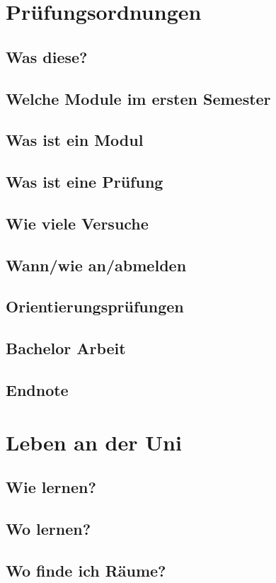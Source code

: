 \documentclass[
	aspectratio=169, 
	8pt 
]{beamer}
\begin{document}
\section{Prüfungsordnungen}
\subsection{Was diese?}
\subsection{Welche Module im ersten Semester}
\subsection{Was ist ein Modul}
\subsection{Was ist eine Prüfung}
\subsection{Wie viele Versuche}
\subsection{Wann/wie an/abmelden}
\subsection{Orientierungsprüfungen}
\subsection{Bachelor Arbeit}
\subsection{Endnote}

\section{Leben an der Uni}
\subsection{Wie lernen?}
\subsection{Wo lernen?}
\subsection{Wo finde ich Räume?}
\end{document}
